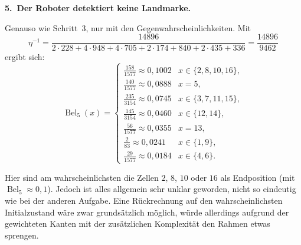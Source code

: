 \documentclass[11pt,a4paper]{article}
\newcommand{\Bel}{\operatorname{Bel}}
\begin{document}
\textbf{5.\ Der Roboter detektiert keine Landmarke.}

Genauso wie Schritt~3, nur mit den Gegenwahrscheinlichkeiten. Mit
\[
  \eta^{-1} = \frac{14896}{2\cdot 228 + 4\cdot 948 + 4\cdot 705 + 2\cdot 174 + 840 + 2\cdot 435 + 336} = \frac{14896}{9462}
\]
ergibt sich:
\[
  \Bel_5(x) =
  \begin{cases}
    \tfrac{158}{1577}\approx 0{,}1002 & x\in\{2,8,10,16\},\\[0.3em]
    \tfrac{140}{1577}\approx 0{,}0888 & x=5,\\[0.3em]
    \tfrac{235}{3154}\approx 0{,}0745 & x\in\{3,7,11,15\},\\[0.3em]
    \tfrac{145}{3154}\approx 0{,}0460 & x\in\{12,14\},\\[0.3em]
    \tfrac{56}{1577}\approx 0{,}0355 & x=13,\\[0.3em]
    \tfrac{2}{83}\approx 0{,}0241 & x\in\{1,9\},\\[0.3em]
    \tfrac{29}{1577}\approx 0{,}0184 & x\in\{4,6\}.
  \end{cases}
\]

Hier sind am wahrscheinlichsten die Zellen $2$, $8$, $10$ oder $16$ als Endposition
(mit $\Bel_5\approx 0{,}1$). Jedoch ist alles allgemein sehr unklar geworden, nicht so eindeutig
wie bei der anderen Aufgabe. Eine Rückrechnung auf den wahrscheinlichsten Initialzustand wäre zwar
grundsätzlich möglich, würde allerdings aufgrund der gewichteten Kanten mit der zusätzlichen
Komplexität den Rahmen etwas sprengen.
\end{document}
